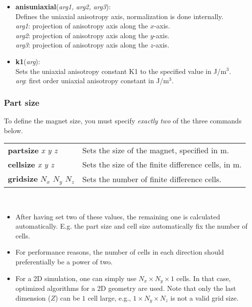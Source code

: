 \begin{itemize}
 \item \textbf{anisuniaxial}(\textit{arg1, arg2, arg3}):\\
				Defines the uniaxial anisotropy axis, normalization is done internally.\\
				\textit{arg1}: projection of anisotropy axis along the $x$-axis.\\
				\textit{arg2}: projection of anisotropy axis along the $y$-axis.\\
				\textit{arg3}: projection of anisotropy axis along the $z$-axis.

 \item \textbf{k1}(\textit{arg}):\\
				Sets the uniaxial anisotropy constant K1 to the specified value in J/m$^3$.\\
				\textit{arg}: first order uniaxial anisotropy constant in J/m$^3$.

\end{itemize}

\newcommand{\defcommand}[2][\space]{\textbf{#2}\index{#2}\label{#2} \textit{#1}}


\subsubsection*{Part size}
To define the magnet size, you must specify \emph{exactly two} of the three commands below.\\

\begin{tabular}{ll}
\defcommand[x y z]{partsize}  & Sets the size of the magnet, specified in m. \\
\defcommand[x y z]{cellsize}  & Sets the size of the finite difference cells, in m. \\
\defcommand[$N_x$ $N_y$ $N_z$]{gridsize} & Sets the number of finite difference cells.
\end{tabular}\\
\bigskip

\begin{itemize}
 \item After having set two of these values, the remaining one is calculated automatically. E.g. the part size and cell size automatically fix the number of cells.
 \item For performance reasons, the number of cells in each direction should preferentially be a power of two.
 \item For a 2D simulation, one can simply use $N_x \times N_y \times 1$ cells. In that case, optimized algorithms for a 2D geometry are used. Note that only the last dimension ($Z$) can be $1$ cell large, e.g., $1 \times N_y \times N_z$ is not a valid grid size.
\end{itemize}


